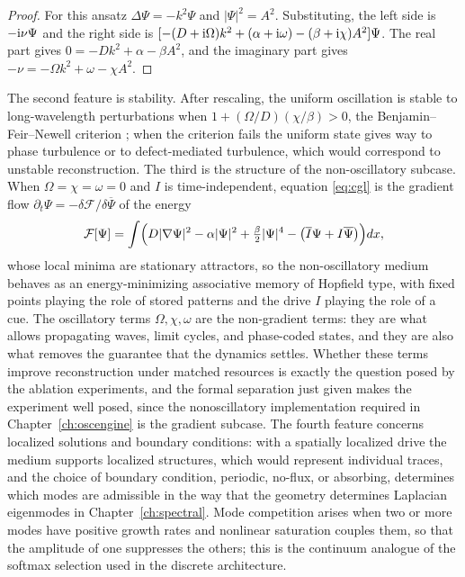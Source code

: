\begin{proof}
For this ansatz $\Delta\Psi=-k^2\Psi$ and $|\Psi|^2=A^2$. Substituting, the left side is $-\mathrm{i}\nu\Psi$ and the right side is $[-(D+\mathrm{i}\Omega)k^2+(\alpha+\mathrm{i}\omega)-(\beta+\mathrm{i}\chi)A^2]\Psi$. The real part gives $0=-Dk^2+\alpha-\beta A^2$, and the imaginary part gives $-\nu=-\Omega k^2+\omega-\chi A^2$.
\end{proof}

The second feature is stability. After rescaling, the uniform oscillation is stable to long-wavelength perturbations when $1+(\Omega/D)(\chi/\beta)>0$, the Benjamin--Feir--Newell criterion \cite{aranson2002}; when the criterion fails the uniform state gives way to phase turbulence or to defect-mediated turbulence, which would correspond to unstable reconstruction. The third is the structure of the non-oscillatory subcase. When $\Omega=\chi=\omega=0$ and $I$ is time-independent, equation \eqref{eq:cgl} is the gradient flow $\partial_t\Psi=-\delta\mathcal F/\delta\overline\Psi$ of the energy
\begin{equation}\label{eq:GLenergy}
\mathcal F[\Psi]=\int\Bigl(D|\nabla\Psi|^2-\alpha|\Psi|^2+\tfrac\beta2|\Psi|^4-\bigl(\overline I\Psi+I\overline\Psi\bigr)\Bigr)dx,
\end{equation}
whose local minima are stationary attractors, so the non-oscillatory medium behaves as an energy-minimizing associative memory of Hopfield type, with fixed points playing the role of stored patterns and the drive $I$ playing the role of a cue. The oscillatory terms $\Omega,\chi,\omega$ are the non-gradient terms: they are what allows propagating waves, limit cycles, and phase-coded states, and they are also what removes the guarantee that the dynamics settles. Whether these terms improve reconstruction under matched resources is exactly the question posed by the ablation experiments, and the formal separation just given makes the experiment well posed, since the nonoscillatory implementation required in Chapter~\ref{ch:oscengine} is the gradient subcase. The fourth feature concerns localized solutions and boundary conditions: with a spatially localized drive the medium supports localized structures, which would represent individual traces, and the choice of boundary condition, periodic, no-flux, or absorbing, determines which modes are admissible in the way that the geometry determines Laplacian eigenmodes in Chapter~\ref{ch:spectral}. Mode competition arises when two or more modes have positive growth rates and nonlinear saturation couples them, so that the amplitude of one suppresses the others; this is the continuum analogue of the softmax selection used in the discrete architecture.

